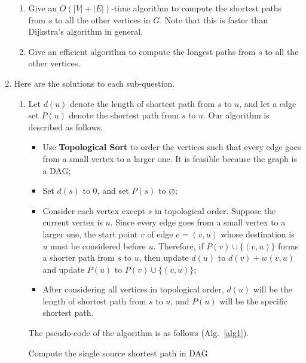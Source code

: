 \documentclass[12pt,a4paper]{article}
\makeatletter
\newtheorem*{solution}{Solution}
\theoremstyle{definition}
\renewenvironment{solution}[1][Solution] {\par\pushQED{\qed}\normalfont\topsep6\p@\@plus6\p@\relax\trivlist\item[\hskip\labelsep\bfseries#1\@addpunct{.}]\ignorespaces}{\popQED\endtrivlist\@endpefalse} \makeatother
\makeatother
\begin{document}
\begin{enumerate}
    \begin{enumerate}
    	\item
    	Give an $O(|V|+|E|)$-time algorithm to compute the shortest paths from $s$ to all the other vertices in $G$. Note that this is faster than Dijkstra's algorithm in general.
    	\item
    	Give an efficient algorithm to compute the longest paths from $s$ to all the other vertices.
    \end{enumerate}
    \begin{solution} Here are the solutions to each sub-question.
    \begin{enumerate}
    \item Let $d(u)$ denote the length of shortest path from $s$ to $u$, and let a edge set $P(u)$ denote the shortest path from $s$ to $u$. Our algorithm is described as follows.
        \begin{itemize}
        \item Use \textbf{Topological Sort} to order the vertices such that every edge goes from a small vertex to a larger one. It is feasible because the graph is a DAG;
        \item Set $d(s)$ to $0$, and set $P(s)$ to $\varnothing$;
        \item Consider each vertex except $s$ in topological order. Suppose the current vertex is $u$. Since every edge goes from a small vertex to a larger one, the start point $v$ of edge $e = (v, u)$ whose destination is $u$ must be considered before $u$. Therefore, if $P(v) \cup \{(v, u)\}$ forms a shorter path from $s$ to $u$, then update $d(u)$ to $d(v) + w(v, u)$ and update $P(u)$ to $P(v) \cup \{(v, u)\}$;
        \item After considering all vertices in topological order, $d(u)$ will be the length of shortest path from $s$ to $u$, and $P(u)$ will be the specific shortest path.
        \end{itemize}
        The pseudo-code of the algorithm is as follows (Alg.~\ref{alg1}).

        \begin{minipage}[t]{0.8\textwidth}
        \begin{algorithm}[H]

            \BlankLine
            \caption{Compute the single source shortest path in DAG}
            \label{alg1}


\end{algorithm}
\end{minipage}
\end{enumerate}
\end{solution}
\end{enumerate}
\end{document}
